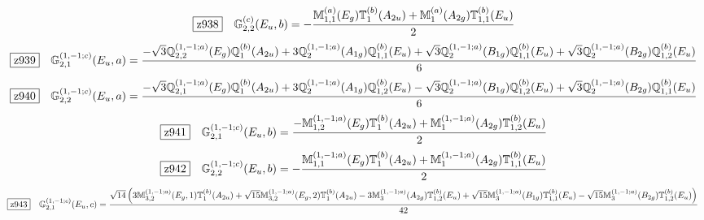 \documentclass[fleqn,10pt,landscape]{jsarticle}
\begin{document}
\begin{dmath*}
\hspace*{3mm}\fbox{z938}\quad \mathbb{G}_{2,2}^{(c)}(E_{u},b)=- \frac{\mathbb{M}_{1,1}^{(a)}(E_{g}) \mathbb{T}_{1}^{(b)}(A_{2u}) + \mathbb{M}_{1}^{(a)}(A_{2g}) \mathbb{T}_{1,1}^{(b)}(E_{u})}{2}
\end{dmath*}
\begin{dmath*}
\hspace*{3mm}\fbox{z939}\quad \mathbb{G}_{2,1}^{(1,-1;c)}(E_{u},a)=\frac{- \sqrt{3} \mathbb{Q}_{2,2}^{(1,-1;a)}(E_{g}) \mathbb{Q}_{1}^{(b)}(A_{2u}) + 3 \mathbb{Q}_{2}^{(1,-1;a)}(A_{1g}) \mathbb{Q}_{1,1}^{(b)}(E_{u}) + \sqrt{3} \mathbb{Q}_{2}^{(1,-1;a)}(B_{1g}) \mathbb{Q}_{1,1}^{(b)}(E_{u}) + \sqrt{3} \mathbb{Q}_{2}^{(1,-1;a)}(B_{2g}) \mathbb{Q}_{1,2}^{(b)}(E_{u})}{6}
\end{dmath*}
\begin{dmath*}
\hspace*{3mm}\fbox{z940}\quad \mathbb{G}_{2,2}^{(1,-1;c)}(E_{u},a)=\frac{- \sqrt{3} \mathbb{Q}_{2,1}^{(1,-1;a)}(E_{g}) \mathbb{Q}_{1}^{(b)}(A_{2u}) + 3 \mathbb{Q}_{2}^{(1,-1;a)}(A_{1g}) \mathbb{Q}_{1,2}^{(b)}(E_{u}) - \sqrt{3} \mathbb{Q}_{2}^{(1,-1;a)}(B_{1g}) \mathbb{Q}_{1,2}^{(b)}(E_{u}) + \sqrt{3} \mathbb{Q}_{2}^{(1,-1;a)}(B_{2g}) \mathbb{Q}_{1,1}^{(b)}(E_{u})}{6}
\end{dmath*}
\begin{dmath*}
\hspace*{3mm}\fbox{z941}\quad \mathbb{G}_{2,1}^{(1,-1;c)}(E_{u},b)=\frac{- \mathbb{M}_{1,2}^{(1,-1;a)}(E_{g}) \mathbb{T}_{1}^{(b)}(A_{2u}) + \mathbb{M}_{1}^{(1,-1;a)}(A_{2g}) \mathbb{T}_{1,2}^{(b)}(E_{u})}{2}
\end{dmath*}
\begin{dmath*}
\hspace*{3mm}\fbox{z942}\quad \mathbb{G}_{2,2}^{(1,-1;c)}(E_{u},b)=- \frac{\mathbb{M}_{1,1}^{(1,-1;a)}(E_{g}) \mathbb{T}_{1}^{(b)}(A_{2u}) + \mathbb{M}_{1}^{(1,-1;a)}(A_{2g}) \mathbb{T}_{1,1}^{(b)}(E_{u})}{2}
\end{dmath*}
\begin{dmath*}
\hspace*{3mm}\fbox{z943}\quad \mathbb{G}_{2,1}^{(1,-1;c)}(E_{u},c)=\frac{\sqrt{14} \left(3 \mathbb{M}_{3,2}^{(1,-1;a)}(E_{g},1) \mathbb{T}_{1}^{(b)}(A_{2u}) + \sqrt{15} \mathbb{M}_{3,2}^{(1,-1;a)}(E_{g},2) \mathbb{T}_{1}^{(b)}(A_{2u}) - 3 \mathbb{M}_{3}^{(1,-1;a)}(A_{2g}) \mathbb{T}_{1,2}^{(b)}(E_{u}) + \sqrt{15} \mathbb{M}_{3}^{(1,-1;a)}(B_{1g}) \mathbb{T}_{1,1}^{(b)}(E_{u}) - \sqrt{15} \mathbb{M}_{3}^{(1,-1;a)}(B_{2g}) \mathbb{T}_{1,2}^{(b)}(E_{u})\right)}{42}
\end{dmath*}
\end{document}
